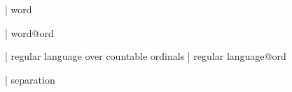  | word

 | word@ord

 | regular language over countable ordinals
 | regular language@ord

 | separation
%
